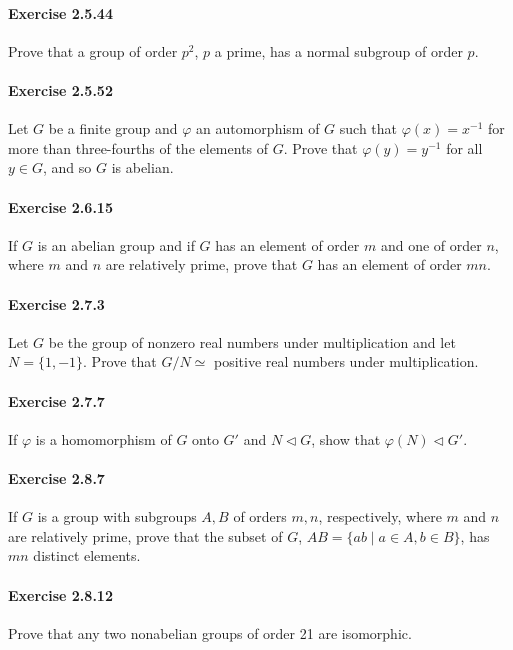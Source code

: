\documentclass{article}
\begin{document}
\paragraph{Exercise 2.5.44} Prove that a group of order $p^2$, $p$ a prime, has a normal subgroup of order $p$.

\paragraph{Exercise 2.5.52} Let $G$ be a finite group and $\varphi$ an automorphism of $G$ such that $\varphi(x) = x^{-1}$ for more than three-fourths of the elements of $G$. Prove that $\varphi(y) = y^{-1}$ for all $y \in G$, and so $G$ is abelian.

\paragraph{Exercise 2.6.15} If $G$ is an abelian group and if $G$ has an element of order $m$ and one of order $n$, where $m$ and $n$ are relatively prime, prove that $G$ has an element of order $mn$.

\paragraph{Exercise 2.7.3} Let $G$ be the group of nonzero real numbers under multiplication and let $N = \{1, -1\}$. Prove that $G / N \simeq$ positive real numbers under multiplication.

\paragraph{Exercise 2.7.7} If $\varphi$ is a homomorphism of $G$ onto $G'$ and $N \triangleleft G$, show that $\varphi(N) \triangleleft G'$.

\paragraph{Exercise 2.8.7} If $G$ is a group with subgroups $A, B$ of orders $m, n$, respectively, where $m$ and $n$ are relatively prime, prove that the subset of $G$, $AB = \{ab \mid a \in A, b \in B\}$, has $mn$ distinct elements.

\paragraph{Exercise 2.8.12} Prove that any two nonabelian groups of order 21 are isomorphic.
\end{document}
